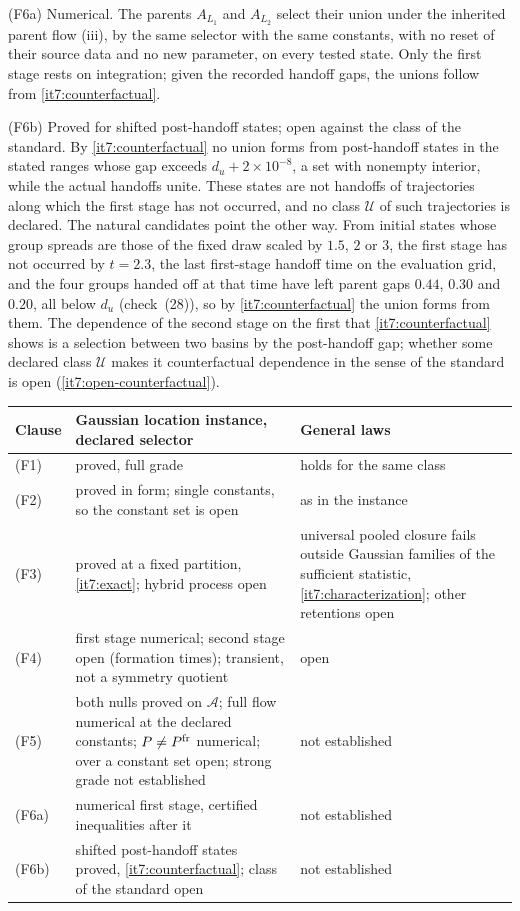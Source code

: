 \documentclass[11pt,letterpaper]{report}
\begin{document}
(F6a) Numerical. The parents $A_{L_1}$ and $A_{L_2}$ select their union under the inherited parent flow (iii), by the same selector with the same constants, with no reset of their source data and no new parameter, on every tested state. Only the first stage rests on integration; given the recorded handoff gaps, the unions follow from \cref{it7:counterfactual}.

(F6b) Proved for shifted post-handoff states; open against the class of the standard. By \cref{it7:counterfactual} no union forms from post-handoff states in the stated ranges whose gap exceeds $d_u+2\times10^{-8}$, a set with nonempty interior, while the actual handoffs unite. These states are not handoffs of trajectories along which the first stage has not occurred, and no class $\mathcal U$ of such trajectories is declared. The natural candidates point the other way. From initial states whose group spreads are those of the fixed draw scaled by $1.5$, $2$ or $3$, the first stage has not occurred by $t=2.3$, the last first-stage handoff time on the evaluation grid, and the four groups handed off at that time have left parent gaps $0.44$, $0.30$ and $0.20$, all below $d_u$ (check~(28)), so by \cref{it7:counterfactual} the union forms from them. The dependence of the second stage on the first that \cref{it7:counterfactual} shows is a selection between two basins by the post-handoff gap; whether some declared class $\mathcal U$ makes it counterfactual dependence in the sense of the standard is open (\cref{it7:open-counterfactual}).

\begin{center}
\small
\begin{tabular}{>{\raggedright\arraybackslash}p{}>{\raggedright\arraybackslash}p{}>{\raggedright\arraybackslash}p{}}
\hline
Clause & Gaussian location instance, declared selector & General laws\\
\hline
(F1) & proved, full grade & holds for the same class\\
(F2) & proved in form; single constants, so the constant set is open & as in the instance\\
(F3) & proved at a fixed partition, \cref{it7:exact}; hybrid process open & universal pooled closure fails outside Gaussian families of the sufficient statistic, \cref{it7:characterization}; other retentions open\\
(F4) & first stage numerical; second stage open (formation times); transient, not a symmetry quotient & open\\
(F5) & both nulls proved on $\mathcal A$; full flow numerical at the declared constants; $P\ne P^{\rm fr}$ numerical; over a constant set open; strong grade not established & not established\\
(F6a) & numerical first stage, certified inequalities after it & not established\\
(F6b) & shifted post-handoff states proved, \cref{it7:counterfactual}; class of the standard open & not established\\
\hline
\end{tabular}
\end{center}
\end{document}
